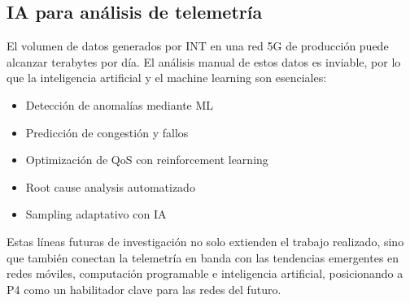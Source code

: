 \subsection{IA para análisis de telemetría}

El volumen de datos generados por INT en una red 5G de producción puede alcanzar terabytes por día. El análisis manual de estos datos es inviable, por lo que la inteligencia artificial y el machine learning son esenciales:

\begin{itemize}
    \item Detección de anomalías mediante ML
    \item Predicción de congestión y fallos
    \item Optimización de QoS con reinforcement learning
    \item Root cause analysis automatizado
    \item Sampling adaptativo con IA
  \end{itemize}

Estas líneas futuras de investigación no solo extienden el trabajo realizado, sino que también conectan la telemetría en banda con las tendencias emergentes en redes móviles, computación programable e inteligencia artificial, posicionando a P4 como un habilitador clave para las redes del futuro.

